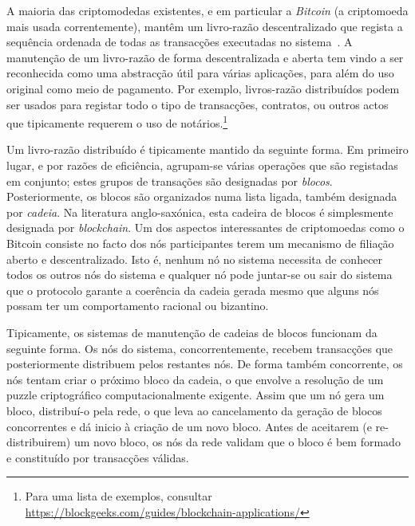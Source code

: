 
A maioria das criptomodedas existentes, e em particular a \emph{Bitcoin} (a criptomoeda mais usada correntemente), mantêm um livro-razão descentralizado que regista a sequência ordenada de todas as transacções executadas no sistema~\cite{nakamoto2008bitcoin}.
A manutenção de um livro-razão de forma descentralizada e aberta tem vindo a ser reconhecida como uma abstracção útil para várias aplicações, para além do uso original como meio de pagamento. 
Por exemplo,  livros-razão distribuídos podem ser usados para  registar todo o tipo de transacções, contratos, ou outros actos que tipicamente requerem o uso de notários.\footnote{Para uma lista de exemplos, consultar \url{https://blockgeeks.com/guides/blockchain-applications/}}

Um livro-razão distribuído é tipicamente mantido da seguinte forma. Em primeiro lugar, e por razões de eficiência, agrupam-se várias operações que são registadas em conjunto; estes grupos de transações são designadas por \emph{blocos}. Posteriormente, os blocos são organizados numa lista ligada, também designada por \emph{cadeia}.  Na literatura anglo-saxónica, esta cadeira de blocos é simplesmente designada por \emph{blockchain}. 
Um dos aspectos interessantes de criptomoedas como o Bitcoin consiste no facto dos nós participantes terem um mecanismo de filiação aberto e descentralizado. Isto é, nenhum nó no sistema necessita de conhecer todos os outros nós do sistema e qualquer nó pode juntar-se ou sair do sistema que o protocolo garante a coerência da cadeia gerada mesmo que alguns nós possam ter um comportamento racional ou bizantino.

Tipicamente, os sistemas de manutenção de cadeias de blocos funcionam da seguinte forma. Os nós do sistema, concorrentemente, recebem transacções que posteriormente distribuem pelos restantes nós. De forma também concorrente, os nós tentam criar o próximo bloco da cadeia, o que envolve a resolução de um puzzle criptográfico computacionalmente exigente. 
Assim que um nó gera um bloco, distribuí-o pela rede, o que leva ao cancelamento da geração de blocos concorrentes e dá inicio à criação de um novo bloco. Antes de aceitarem (e re-distribuirem) um novo bloco, os nós da rede validam que o bloco é bem formado e constituído por transacções válidas. 

